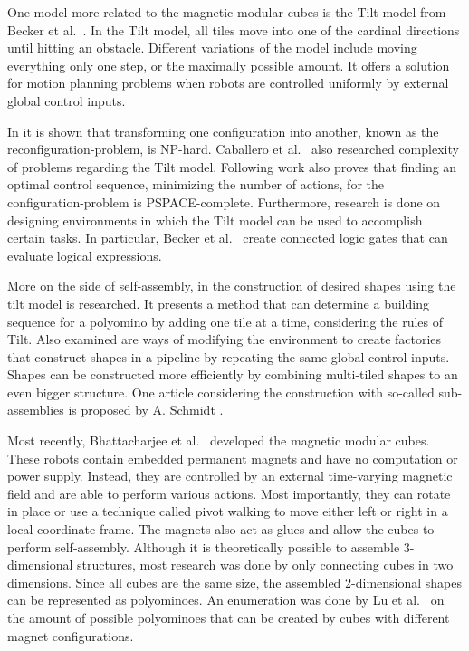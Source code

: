 One model more related to the magnetic modular cubes is the Tilt model from Becker et al.\ \cite{Becker2014_SP}.
In the Tilt model, all tiles move into one of the cardinal directions until hitting an obstacle.
Different variations of the model include moving everything only one step, or the maximally possible amount.
It offers a solution for motion planning problems when robots are controlled uniformly by external global control inputs.

In \cite{Becker2014_SP} it is shown that transforming one configuration into another, known as the reconfiguration-problem, is NP-hard.
Caballero et al.\ \cite{caballero2020} also researched complexity of problems regarding the Tilt model.
Following work \cite{Becker2014} also proves that finding an optimal control sequence, minimizing the number of actions, for the configuration-problem is PSPACE-complete.
Furthermore, research is done on designing environments in which the Tilt model can be used to accomplish certain tasks.
In particular, Becker et al.\ \cite{Becker2014} create connected logic gates that can evaluate logical expressions.

More on the side of self-assembly, in \cite{Becker2020} the construction of desired shapes using the tilt model is researched.
It presents a method that can determine a building sequence for a polyomino by adding one tile at a time, considering the rules of Tilt.
Also examined are ways of modifying the environment to create factories that construct shapes in a pipeline by repeating the same global control inputs.
Shapes can be constructed more efficiently by combining multi-tiled shapes to an even bigger structure.
One article considering the construction with so-called sub-assemblies is proposed by A. Schmidt \cite{Schmidt2018}.

Most recently, Bhattacharjee et al.\ \cite{Bhattacharjee2022} developed the magnetic modular cubes.
These robots contain embedded permanent magnets and have no computation or power supply.
Instead, they are controlled by an external time-varying magnetic field and are able to perform various actions.
Most importantly, they can rotate in place or use a technique called pivot walking to move either left or right in a local coordinate frame.
The magnets also act as glues and allow the cubes to perform self-assembly.
Although it is theoretically possible to assemble 3-dimensional structures, most research was done by only connecting cubes in two dimensions.
Since all cubes are the same size, the assembled 2-dimensional shapes can be represented as polyominoes.
An enumeration was done by Lu et al.\ \cite{Lu2021} on the amount of possible polyominoes that can be created by cubes with different magnet configurations.

